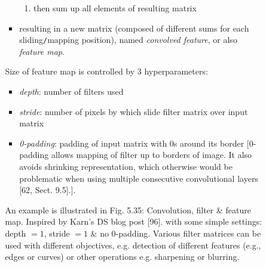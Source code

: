 \documentclass{article}
\begin{document}
\begin{itemize}
\begin{itemize}
\begin{itemize}
\begin{itemize}
\begin{enumerate}
					\item then sum up all elements of resulting matrix
				\end{enumerate}
				\item resulting in a new matrix (composed of different sums for each sliding{\tt/}mapping position), named {\it convolved feature}, or also {\it feature map}.
			\end{itemize}
			Size of feature map is controlled by 3 hyperparameters:
			\begin{itemize}
				\item {\it depth}: number of filters used
				\item {\it stride}: number of pixels by which slide filter matrix over input matrix
				\item {\it0-padding}: padding of input matrix with 0s around its border [0-padding allows mapping of filter up to borders of image. It also avoids shrinking representation, which otherwise would be problematic when using multiple consecutive convolutional layers [62, Sect. 9.5].].
			\end{itemize}
			An example is illustrated in {\sf Fig. 5.35: Convolution, filter \& feature map. Inspired by {\sc Karn}'s DS blog post [96].} with some simple settings: depth $= 1$, stride $= 1$ \& no 0-padding. Various filter matrices can be used with different objectives, e.g. detection of different features (e.g., edges or curves) or other operations e.g. sharpening or blurring.
			

\end{itemize}
\end{itemize}
\end{itemize}
\end{document}
